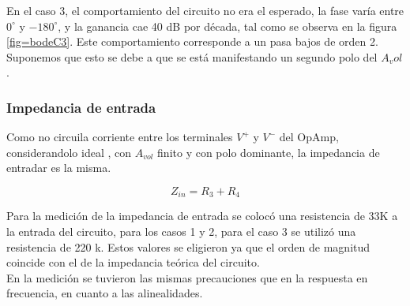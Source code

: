 \documentclass[../../main.tex]{subfiles}
\begin{document}
En el caso 3, el comportamiento del circuito no era el esperado, la fase varía entre $0^{\circ}$ y $-180^{\circ}$, y la ganancia cae  40 dB por década, tal como se observa en la figura \ref{fig=bodeC3}. Este comportamiento corresponde a un  pasa bajos de orden 2. Suponemos que esto se debe a que se está manifestando un segundo polo del $A_vol$.

\subsubsection{Impedancia de entrada}

Como no circuila corriente entre los terminales $V^{+}$ y $V^{-}$ del OpAmp, considerandolo ideal , con $A_{vol}$ finito y con polo dominante, la impedancia de entradar es la misma.

\begin{equation}
Z_{in}=R_{3} + R_{4}
\end{equation}

Para la medición de la impedancia de entrada se colocó una resistencia de 33K a la entrada del circuito, para los casos 1 y 2, para el caso 3 se utilizó una resistencia de 220 k. Estos valores se eligieron ya que el orden de magnitud coincide con el de la impedancia teórica del circuito.
\\
En la medición se tuvieron las mismas precauciones que en la respuesta en frecuencia, en cuanto a las alinealidades.
\end{document}
